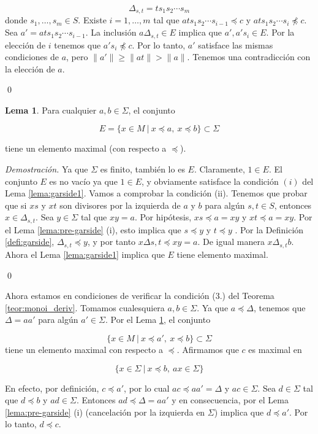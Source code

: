 \documentclass[12pt]{article}
\theoremstyle{definition}
\newtheorem{lema}{Lema}[section]
\providecommand{\norm}[1]{\lVert#1\rVert}
\begin{document}
$$\Delta_{s,t}=ts_1s_2\cdots s_m$$
\newline
donde $s_1,\ldots,s_m\in S$. Existe $i=1,\ldots,m$ tal que $ats_1s_2\cdots s_{i-1}\preceq c$ y $ats_1s_2\cdots s_{i}\npreceq c$. Sea $a'=ats_1s_2\cdots s_{i-1}$. La inclusión $a\Delta_{s,t}\in E$ implica que $a',a's_i\in E$. Por la elección de $i$ tenemos que $a's_i\npreceq c$. Por lo tanto, $a'$ satisface las mismas condiciones de $a$, pero $\norm{a'}\geq \norm{at}> \norm{a}$. Tenemos una contradicción con la elección de $a$.

\qed

\begin{lema}
Para cualquier $a,b\in\Sigma$, el conjunto

$$E=\{x\in M\ |\ x\preceq a,\ x\preceq b\}\subset \Sigma$$

tiene un elemento maximal (con respecto a $\preceq$).
\label{lema:garside2}
\end{lema}

\textit{Demostración.} Ya que $\Sigma$ es finito, también lo es $E$. Claramente, $1\in E$. El conjunto $E$ es no vacío ya que $1\in E$, y obviamente satisface la condición $(i)$ del Lema \ref{lema:garside1}. Vamos a comprobar la condición (ii). Tenemos que probar que si $xs$ y $xt$ son divisores por la izquierda de $a$ y $b$ para algún $s,t\in S$, entonces $x\in\Delta_{s,t}$. Sea $y\in\Sigma$ tal que $xy=a$. Por hipótesis, $xs\preceq a = xy$ y $xt\preceq a = xy$. Por el Lema \ref{lema:pre-garside} (i), esto implica que $s\preceq y$ y $t\preceq y$ . Por la Definición \ref{defi:garside}, $\Delta_{s,t}\preceq y$, y por tanto $x\Delta{s,t}\preceq xy=a$. De igual manera $x\Delta_{s,t} b$. Ahora el Lema \ref{lema:garside1} implica que $E$ tiene elemento maximal.

\qed

Ahora estamos en condiciones de verificar la condición (3.) del Teorema \ref{teor:monoi_deriv}. Tomamos cualesquiera $a,b\in\Sigma$. Ya que $a\preceq\Delta$, tenemos que $\Delta=aa'$ para algún $a'\in\Sigma$. Por el Lema \ref{lema:garside2}, el conjunto

$$\{x\in M\ |\ x\preceq a',\ x\preceq b\}\subset\Sigma$$ tiene un elemento maximal con respecto a $\preceq$. Afirmamos que $c$ es maximal en 

$$\{x\in\Sigma\ |\ x\preceq b,\ ax\in\Sigma\}$$

En efecto, por definición, $c\preceq a'$, por lo cual $ac\preceq aa'=\Delta$ y $ac\in\Sigma$. Sea $d\in\Sigma$ tal que $d\preceq b$ y $ad\in\Sigma$. Entonces $ad\preceq\Delta=aa'$ y en consecuencia, por el Lema \ref{lema:pre-garside} (i) (cancelación por la izquierda en $\Sigma$) implica que $d\preceq a'$. Por lo tanto, $d\preceq c$.
\end{document}
